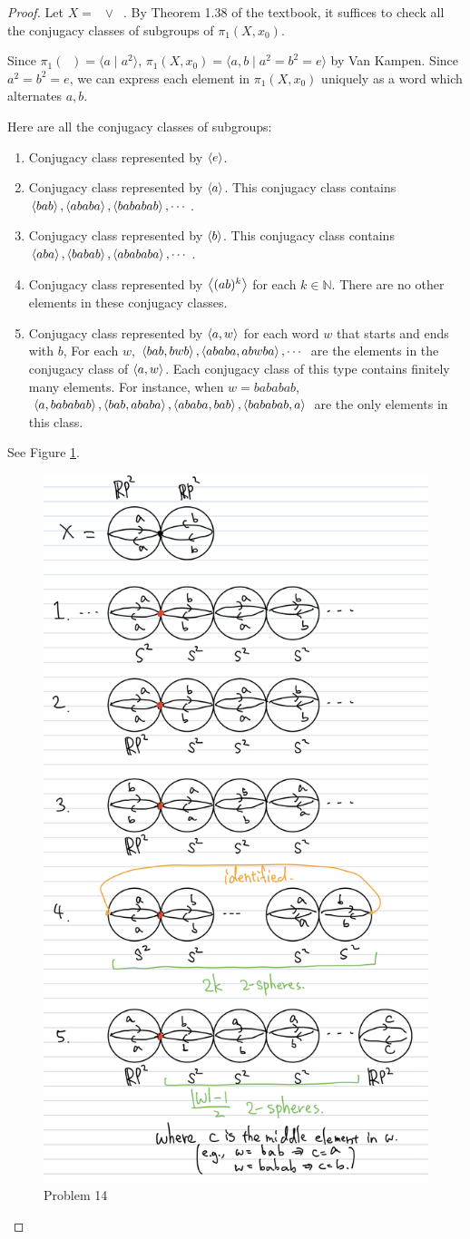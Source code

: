 \documentclass[12pt, psamsfonts]{amsart}
\theoremstyle{definition}
\theoremstyle{remark}
\DeclareMathOperator{\RP}{\mathbb{R}\mathbf{P}^2}
\numberwithin{equation}{section}
\begin{document}
\begin{proof}
  Let $X = \RP \vee \RP$.
  By Theorem 1.38 of the textbook, it suffices to check all the conjugacy classes of subgroups of $\pi_1(X, x_0)$.

  Since $\pi_1(\RP) = \langle a \mid a^2 \rangle$, $\pi_1(X, x_0) = \langle a, b \mid a^2 = b^2 = e \rangle$ by Van Kampen.
  Since $a^2 = b^2 = e$, we can express each element in $\pi_1(X, x_0)$ uniquely as a word which alternates $a, b$.

  Here are all the conjugacy classes of subgroups:
  \begin{enumerate}
    \item
      Conjugacy class represented by $\ev{e}$.
    \item
      Conjugacy class represented by $\ev{a}$.
      This conjugacy class contains $\ev{bab}, \ev{ababa}, \ev{bababab}, \cdots$.
    \item
      Conjugacy class represented by $\ev{b}$.
      This conjugacy class contains $\ev{aba}, \ev{babab}, \ev{abababa}, \cdots$.
    \item
      Conjugacy class represented by $\ev{(ab)^k}$ for each $k \in \mathbb{N}$.
      There are no other elements in these conjugacy classes.
    \item
      Conjugacy class represented by $\ev{a, w}$ for each word $w$ that starts and ends with $b$,
      For each $w$, $\ev{bab, bwb}, \ev{ababa, abwba}, \cdots$ are the elements in the conjugacy class of $\ev{a, w}$.
      Each conjugacy class of this type contains finitely many elements.
      For instance, when $w = bababab$, $\ev{a, bababab}, \ev{bab, ababa}, \ev{ababa, bab}, \ev{bababab, a}$ are the only elements in this class.
  \end{enumerate}

  See Figure \ref{fig:problem14}.
  \begin{figure}
    \includegraphics[width=.5\linewidth]{problem14_rp2.jpeg}
    \caption{Problem 14}
    \label{fig:problem14}
  \end{figure}
\end{proof}
\end{document}
